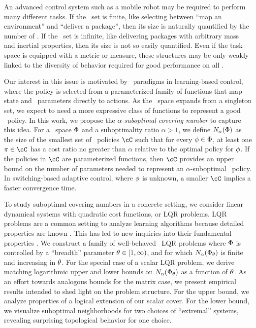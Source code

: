 An advanced control system such as a mobile robot may be required to perform many different tasks.
If the \envword\ set is finite, like selecting between ``map an environment'' and ``deliver a package'',
then its size is naturally quantified by the number of \envwords.
If the \envword\ set is infinite, like delivering packages with arbitrary mass and inertial properties,
then its size is not so easily quantified.
Even if the task space is equipped with a metric or measure,
these structures may be only weakly linked to the diversity of behavior
required for good performance on all \envwords.

Our interest in this issue is motivated by \multienv\ paradigms in learning-based control,
where the policy is selected from a parameterized family of functions
that map state and \envword\ parameters directly to actions.
As the \envword\ space expands from a singleton set,
we expect to need a more expressive class of functions
to represent a good \multienv\ policy.
In this work, we propose the 
\emph{$\alpha$-suboptimal covering number}
to capture this idea. %
For a \envword\ space $\Phi$
and a suboptimality ratio $\alpha > 1$,
we define $N_{\alpha}(\Phi)$ as
the size of the smallest set of \singleenv\ policies $\coveringset$ %
such that for every $\phi \in \Phi$, at least one $\pi \in \coveringset$
has a cost ratio no greater than $\alpha$ relative to the optimal policy for $\phi$.
If the policies in $\coveringset$ are parameterized functions,
then $\coveringset$ provides an upper bound on the number of parameters
needed to represent an $\alpha$-suboptimal \multienv\ policy.
In switching-based adaptive control, where $\phi$ is unknown,
a smaller $\coveringset$ implies a faster convergence time.

To study suboptimal covering numbers in a concrete setting,
we consider linear dynamical systems
with quadratic cost functions, or LQR problems.
LQR problems are a common setting to analyze learning algorithms because detailed properties are known \citep[for example]{fazel-global-lqr}.
This has led to new inquiries into their fundamental properties \citep{bu-topological-gains}.
We construct a family of well-behaved \multienv\ LQR problems 
where $\Phi$ is controlled by a ``breadth'' parameter $\theta \in [1, \infty)$,
and for which
$N_{\alpha}(\Phi_\theta)$
is finite and increasing in $\theta$.
For the special case of a scalar LQR problem,
we derive matching logarithmic upper and lower bounds on
$N_{\alpha}(\Phi_\theta)$
as a function of $\theta$.
As an effort towards analogous bounds for the matrix case,
we present empirical results intended to shed light on the problem structure.
For the upper bound, we analyze properties of a logical extension of our scalar cover.
For the lower bound, we visualize suboptimal neighborhoods for two choices of ``extremal''  systems,
revealing surprising topological behavior for one choice.


